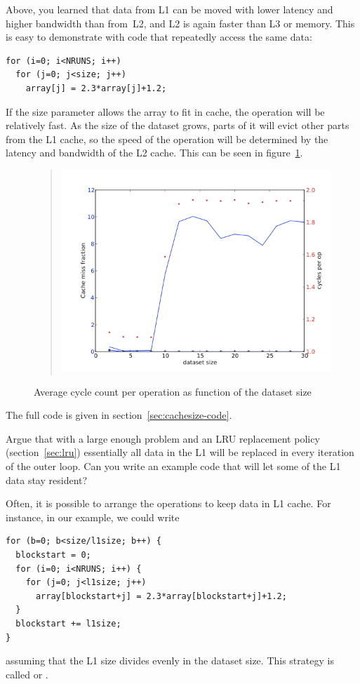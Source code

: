 Above, you learned that data from L1 can be moved with lower latency
and higher bandwidth than from~L2, and L2 is again faster than L3 or
memory. This is easy to demonstrate with code that repeatedly access
the same data:
\begin{verbatim}
for (i=0; i<NRUNS; i++)
  for (j=0; j<size; j++)
    array[j] = 2.3*array[j]+1.2;
\end{verbatim}
If the size parameter allows the array to fit in cache, the operation
will be relatively fast. As the size of the dataset grows, parts of it
will evict other parts from the L1 cache, so the speed of the
operation will be determined by the latency and bandwidth of the L2
cache. This can be seen in figure~\ref{fig:cache-overflow}.
\begin{figure}[ht]
  \begin{quote}
  \includegraphics[scale=.5]{graphics/cacheoverflow}
  \end{quote}
  \caption{Average cycle count per operation as function of the
    dataset size}
  \label{fig:cache-overflow}
\end{figure}
The full code is given in section~\ref{sec:cachesize-code}.

\begin{exercise}
  Argue that with a large enough problem and an \ac{LRU} replacement policy
  (section~\ref{sec:lru}) essentially all data in the L1 will be
  replaced in every iteration of the outer loop. Can you write an
  example code that will let some of the L1 data stay resident?
\end{exercise}

Often, it is possible to arrange the operations to keep data in L1
cache. For instance, in our example, we could write
\begin{verbatim}
for (b=0; b<size/l1size; b++) {
  blockstart = 0;
  for (i=0; i<NRUNS; i++) {
    for (j=0; j<l1size; j++)
      array[blockstart+j] = 2.3*array[blockstart+j]+1.2; 
  }
  blockstart += l1size;
}
\end{verbatim}
assuming that the L1 size divides evenly in the dataset size.
This strategy is called  or
.

